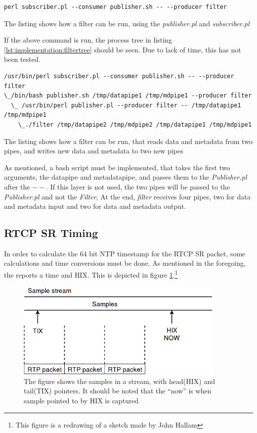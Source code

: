 \begin{listing}[H] 
\begin{verbatim}
perl subscriber.pl --consumer publisher.sh -- --producer filter
\end{verbatim}
\caption{The listing shows how a filter can be run, using the \textit{publisher.pl} and \textit{subscriber.pl}}
\label{lst:implementation:filter}
\end{listing}

If the above command is run, the process tree in listing \ref{lst:implementation:filtertree} should be seen. Due to lack of time, this has not been tested.

\begin{listing}[H] 
\begin{verbatim}
/usr/bin/perl subscriber.pl --consumer publisher.sh -- --producer filter
\_/bin/bash publisher.sh /tmp/datapipe1 /tmp/mdpipe1 --producer filter
  \_ /usr/bin/perl publisher.pl --producer filter -- /tmp/datapipe1 /tmp/mdpipe1
    \_./filter /tmp/datapipe2 /tmp/mdpipe2 /tmp/datapipe1 /tmp/mdpipe1
\end{verbatim}
\caption{The listing shows how a filter can be run, that reads data and metadata from two pipes, and writes new data and metadata to two new pipes}
\label{lst:implementation:filter}
\end{listing}
As mentioned, a bash script must be implemented, that takes the first two arguments, the datapipe and metadatapipe, and passes them to the \textit{Publisher.pl} after the $--$. If this layer is not used, the two pipes will be passed to the \textit{Publisher.pl} and not the \textit{Filter}, At the end, \textit{filter} receives four pipes, two for data and metadata input and two for data and metadata output.

\subsection{RTCP SR Timing} \label{sec:design:rtcpsr}
In order to calculate the 64 bit NTP timestamp for the RTCP SR packet, some calculations and time conversions must be done. As mentioned in the foregoing, the  reports a time and \ac{HIX}. This is depicted in figure \ref{fig:implementation:rtcpsr}.\footnote{This figure is a redrawing of a sketch made by John Hallam}
\begin{figure}[H]
	\centering
	\includegraphics[width=0.9\textwidth]{figures/rtcp_sr_timing}
	\caption{The figure shows the samples in a stream, with head(HIX) and tail(TIX) pointers. It should be noted that the ``now'' is when sample pointed to by HIX is captured}\label{fig:implementation:rtcpsr}
\end{figure}

